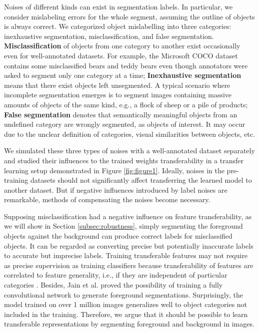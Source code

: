 Noises of different kinds can exist in segmentation labels. %
In particular, we consider mislabeling errors for the whole segment, assuming the outline of objects is always correct.
We categorized object mislabelling into three categories: inexhaustive segmentation, misclassification, and false segmentation.
\textbf{Misclassification} of objects from one category to another exist occasionally even for well-annotated datasets.
For example, the Microsoft COCO dataset \cite{lin2014microsoft} contains some misclassified bears and teddy bears even though annotators were asked to segment only one category at a time;
\textbf{Inexhaustive segmentation} means that there exist objects left unsegmented.
A typical scenario where incomplete segmentation emerges is to segment images containing massive amounts of objects of the same kind, e.g., a flock of sheep or a pile of products;
\textbf{False segmentation} denotes that semantically meaningful objects from an undefined category are wrongly segmented, as objects of interest.
It may occur due to the unclear definition of categories, visual similarities between objects, etc.



We simulated these three types of noises with a well-annotated dataset separately and studied their influences to the trained weights transferability in a transfer learning setup demonstrated in Figure \ref{fig:figure1}.
Ideally, noises in the pre-training datasets should not significantly affect transferring the learned model to another dataset.
But if negative influences introduced by label noises are remarkable, methods of compensating the noises become necessary.


Supposing misclassification had a negative influence on feature transferability, as we will show in Section \ref{subsec:robustness}, simply segmenting the foreground objects against the background can produce correct labels for misclassified objects.
It can be regarded as converting precise but potentially inaccurate labels to accurate but imprecise labels.
Training transferable features may not require as precise supervision as training classifiers because transferability of features are correlated to feature generality, i.e., if they are independent of particular categories \cite{yosinski2014transferable}.
Besides, Jain et al. \cite{jain2017pixel} proved the possibility of training a fully convolutional network to generate foreground segmentations.
Surprisingly, the model trained on over 1 million images generalizes well to object categories not included in the training.
Therefore, we argue that it should be possible to learn transferable representations by segmenting foreground and background in images.

